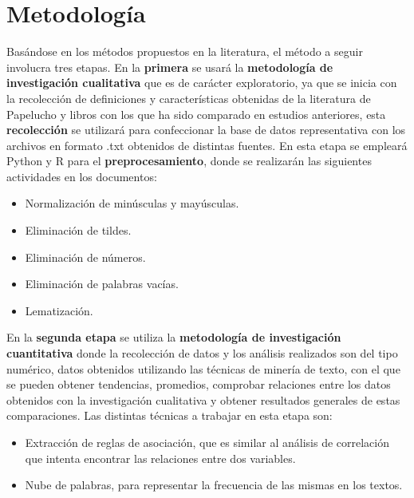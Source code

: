        
\section{Metodología}

Basándose en los métodos propuestos en la literatura, el método a seguir involucra tres etapas. En la \textbf{primera} se usará la \textbf{metodología de investigación cualitativa} que es de carácter exploratorio, ya que se inicia con la recolección de definiciones y características obtenidas de la literatura de Papelucho y libros con los que ha sido comparado en estudios anteriores, esta \textbf{recolección} se utilizará para confeccionar la base de datos representativa con los archivos en formato .txt obtenidos de distintas fuentes. En esta etapa se empleará Python y R para el \textbf{preprocesamiento}, donde se realizarán las siguientes actividades en los documentos:
\begin{itemize}
    \item Normalización de minúsculas y mayúsculas.
    \item Eliminación de tildes.
    \item Eliminación de números.
    \item Eliminación de palabras vacías.
    \item Lematización.
\end{itemize}


En la \textbf{segunda etapa} se utiliza la \textbf{metodología de investigación cuantitativa} donde la recolección de datos y los análisis realizados son del tipo numérico, datos obtenidos utilizando las técnicas de minería de texto, con el que se pueden obtener tendencias, promedios, comprobar relaciones entre los datos obtenidos con la investigación cualitativa y obtener resultados generales de estas comparaciones. Las distintas técnicas a trabajar en esta etapa son:
\begin{itemize}
    \item Extracción de reglas de asociación, que es similar al análisis de correlación que intenta encontrar las relaciones entre dos variables.
    \item Nube de palabras, para representar la frecuencia de las mismas en los textos.
\end{itemize}


